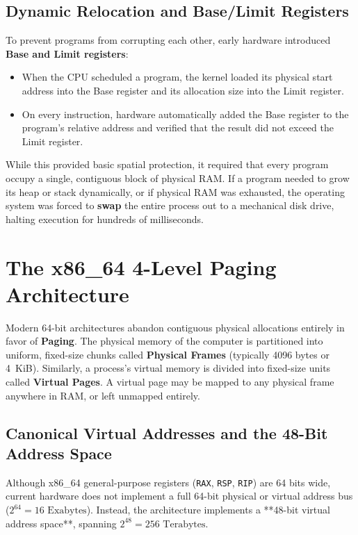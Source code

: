 \subsection{Dynamic Relocation and Base/Limit Registers}
To prevent programs from corrupting each other, early hardware introduced \textbf{Base and Limit registers}:
\begin{itemize}
    \item When the CPU scheduled a program, the kernel loaded its physical start address into the Base register and its allocation size into the Limit register.
    \item On every instruction, hardware automatically added the Base register to the program's relative address and verified that the result did not exceed the Limit register.
\end{itemize}
While this provided basic spatial protection, it required that every program occupy a single, contiguous block of physical RAM. If a program needed to grow its heap or stack dynamically, or if physical RAM was exhausted, the operating system was forced to \textbf{swap} the entire process out to a mechanical disk drive, halting execution for hundreds of milliseconds.

\section{The x86\_64 4-Level Paging Architecture}
\label{sec:paging_arch}

Modern 64-bit architectures abandon contiguous physical allocations entirely in favor of \textbf{Paging}. The physical memory of the computer is partitioned into uniform, fixed-size chunks called \textbf{Physical Frames} (typically 4096 bytes or 4~KiB). Similarly, a process's virtual memory is divided into fixed-size units called \textbf{Virtual Pages}. A virtual page may be mapped to any physical frame anywhere in RAM, or left unmapped entirely.

\subsection{Canonical Virtual Addresses and the 48-Bit Address Space}
Although x86\_64 general-purpose registers (\texttt{RAX}, \texttt{RSP}, \texttt{RIP}) are 64 bits wide, current hardware does not implement a full 64-bit physical or virtual address bus ($2^{64} = 16\text{ Exabytes}$). Instead, the architecture implements a **48-bit virtual address space**, spanning $2^{48} = 256\text{ Terabytes}$.

